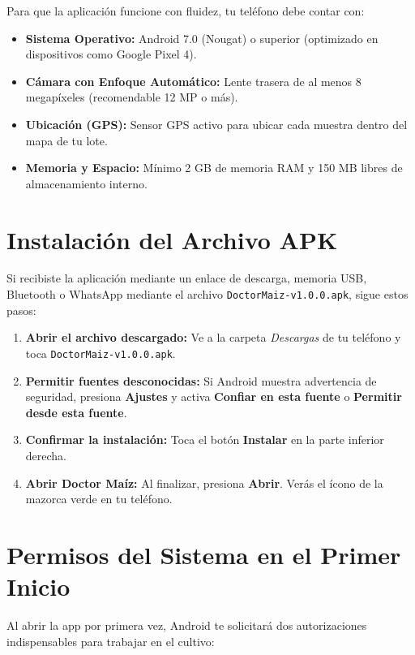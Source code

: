 \documentclass[11pt,a4paper]{report}
\begin{document}
Para que la aplicación funcione con fluidez, tu teléfono debe contar con:
\begin{itemize}[leftmargin=1.4em,itemsep=1.5pt,topsep=2pt,partopsep=0pt,parsep=0pt]
    \item \textbf{Sistema Operativo:} Android 7.0 (Nougat) o superior (optimizado en dispositivos como Google Pixel 4).
    \item \textbf{Cámara con Enfoque Automático:} Lente trasera de al menos 8 megapíxeles (recomendable 12 MP o más).
    \item \textbf{Ubicación (GPS):} Sensor GPS activo para ubicar cada muestra dentro del mapa de tu lote.
    \item \textbf{Memoria y Espacio:} Mínimo 2 GB de memoria RAM y 150 MB libres de almacenamiento interno.
\end{itemize}

\section{Instalación del Archivo APK}
Si recibiste la aplicación mediante un enlace de descarga, memoria USB, Bluetooth o WhatsApp mediante el archivo \texttt{DoctorMaiz-v1.0.0.apk}, sigue estos pasos:

\begin{pasoapaso}[top=2.5mm,bottom=2.5mm,left=3.5mm,right=3.5mm]
\begin{enumerate}[leftmargin=1.4em,itemsep=1.5pt,topsep=2pt,partopsep=0pt,parsep=0pt]
    \item \textbf{Abrir el archivo descargado:} Ve a la carpeta \textit{Descargas} de tu teléfono y toca \texttt{DoctorMaiz-v1.0.0.apk}.
    \item \textbf{Permitir fuentes desconocidas:} Si Android muestra advertencia de seguridad, presiona \textbf{Ajustes} y activa \textbf{Confiar en esta fuente} o \textbf{Permitir desde esta fuente}.
    \item \textbf{Confirmar la instalación:} Toca el botón \textbf{Instalar} en la parte inferior derecha.
    \item \textbf{Abrir Doctor Maíz:} Al finalizar, presiona \textbf{Abrir}. Verás el ícono de la mazorca verde en tu teléfono.
\end{enumerate}
\end{pasoapaso}

\section{Permisos del Sistema en el Primer Inicio}
Al abrir la app por primera vez, Android te solicitará dos autorizaciones indispensables para trabajar en el cultivo:
\end{document}
